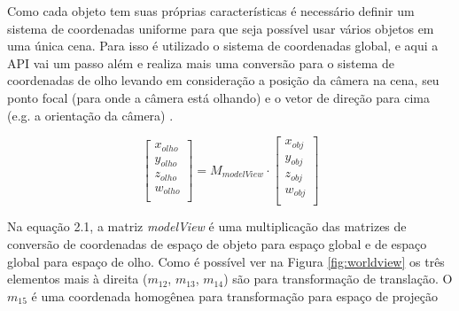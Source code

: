 Como cada objeto tem suas próprias características é necessário definir um sistema de coordenadas uniforme para que seja possível usar vários objetos em uma única cena. Para isso é utilizado o sistema de coordenadas global, e aqui a API vai um passo além e realiza mais uma conversão para o sistema de coordenadas de olho levando em consideração a posição da câmera na cena, seu ponto focal (para onde a câmera está olhando) e o vetor de direção para cima (e.g. a orientação da câmera) \cite{GLSLBook}. 

	\begin{equation}
		\begin{bmatrix}
			x_{olho} \\
			y_{olho} \\
			z_{olho} \\
			w_{olho} \\
		\end{bmatrix}
		=
		M_{modelView} \cdot
		\begin{bmatrix}
			x_{obj} \\
			y_{obj} \\
			z_{obj} \\
			w_{obj} \\
		\end{bmatrix}
	\end{equation}

Na equação 2.1, a matriz \textit{modelView} é uma multiplicação das matrizes de conversão de coordenadas de espaço de objeto para espaço global e de espaço global para espaço de olho. Como é possível ver na Figura \ref{fig:worldview} os três elementos mais à direita ($ m_{12} $, $ m_{13} $, $ m_{14} $) são para transformação de translação. O $ m_{15} $ é uma coordenada homogênea para transformação para espaço de projeção \cite{openglOnline}

	\begin{figure}[h!]
		\centering
	\end{figure}

